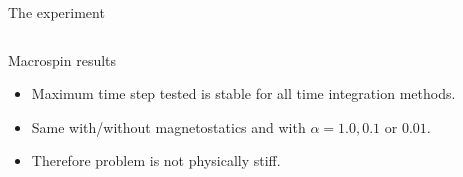 \documentclass[final]{beamer} %
\newlength{\wideitemsep}
\let\olditem\item
\renewcommand{\item}{\setlength{\itemsep}{\wideitemsep}\olditem}
\newlength{\columnheight}
\begin{document}
\begin{frame}
\begin{columns}
\begin{column}{0.47\textwidth}
{\begin{block}{\boxnumber The experiment}
\begin{columns}
          \end{columns}
         
      \end{block}


      \vfill

      \begin{block}{\boxnumber Macrospin results}
        \begin{itemize}
        \item Maximum time step tested is stable for all time integration methods.
        \item Same with/without magnetostatics and with $\alpha = 1.0, 0.1$ or $0.01$.
        \item Therefore problem is not physically stiff.
        \end{itemize}
      \end{block}

        \vfill





      } %
    \end{column}

    \begin{column}{0.47\textwidth}
      \parbox[t][\columnheight]{\textwidth}{

}
\end{column}
\end{columns}
\end{frame}
\end{document}
